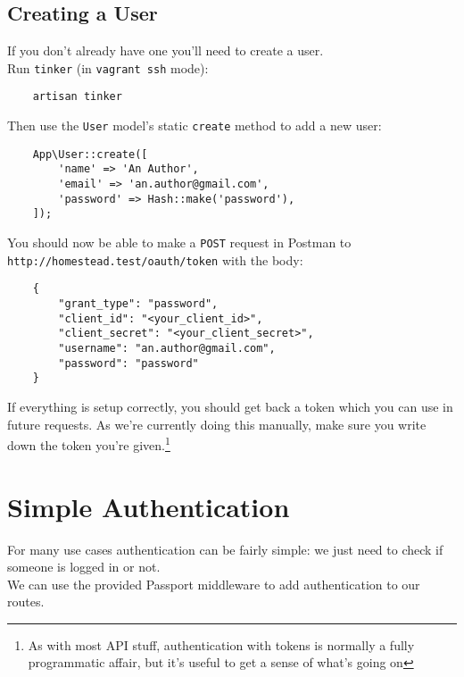 \subsection{Creating a User}

If you don't already have one you'll need to create a user.
\\

Run \texttt{tinker} (in \texttt{vagrant ssh} mode):

\begin{verbatim}
    artisan tinker
\end{verbatim}

Then use the \texttt{User} model's static \texttt{create} method to add a new user:

\begin{verbatim}
    App\User::create([
        'name' => 'An Author',
        'email' => 'an.author@gmail.com',
        'password' => Hash::make('password'),
    ]);
\end{verbatim}

You should now be able to make a \texttt{POST} request in Postman to \\ \texttt{http://homestead.test/oauth/token} with the body:

\begin{verbatim}
    {
        "grant_type": "password",
        "client_id": "<your_client_id>",
        "client_secret": "<your_client_secret>",
        "username": "an.author@gmail.com",
        "password": "password"
    }
\end{verbatim}

If everything is setup correctly, you should get back a token which you can use in future requests. As we're currently doing this manually, make sure you write down the token you're given.\footnote{As with most API stuff, authentication with tokens is normally a fully programmatic affair, but it's useful to get a sense of what's going on}


\pagebreak


\section{Simple Authentication}

For many use cases authentication can be fairly simple: we just need to check if someone is logged in or not.
\\

We can use the provided Passport middleware to add authentication to our routes.


